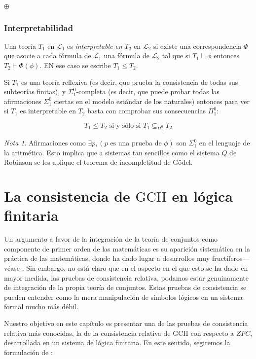 \documentclass[11pt,a4paper]{book}
\theoremstyle{plain}
\theoremstyle{definition}
\theoremstyle{remark}
\newtheorem{nota}[teorema]{Nota}
\begin{document}
$\oplus$ 



\subsection{Interpretabilidad}

Una teoría $T_1$ en $\mathcal{L}_1$ es \textit{interpretable en} $T_2$ en $\mathcal{L_2}$ si existe una correspondencia $\Phi$ que asocie a cada fórmula de $\mathcal{L}_1$ una fórmula de $\mathcal{L_2}$ tal que si $T_1 \vdash \phi$ entonces $T_2 \vdash \Phi(\phi)$. EN ese caso se escribe $T_1 \leq T_2$.

Si $ T_1 $ es una teoría reflexiva (es decir, que prueba la consistencia de todas sus subteorías finitas), y $\Sigma^0_1$-completa (es decir, que puede probar todas las afirmaciones $\Sigma^0_1$ ciertas en el modelo estándar de los naturales) entonces para ver si $T_1$ es interpretable en $T_2 $ basta con comprobar sus consecuencias $\Pi^0_1$:

$$ T_1 \leq T_2 \text{ si y sólo si }  T_1 \subseteq_{\Pi^0_1} T_2 $$



\begin{nota}
  Afirmaciones como $\exists p, (p \text{ es una prueba de } \phi)$ son $\Sigma^0_1$ en el lenguaje de la aritmética. Esto implica que a sistemas tan sencillos como el sistema $Q$ de Robinson se les aplique el teorema de incompletitud de Gödel.
\end{nota}


\chapter{La consistencia de \texorpdfstring{$\mathrm{GCH}$}{GCH} en lógica finitaria}

Un argumento a favor de la integración de la teoría de conjuntos como componente de primer orden de las matemáticas es su aparición sistemática en la práctica de las matemáticas, donde ha dado lugar a desarrollos muy fructíferos---véase \textcite{Maddy1997}. Sin embargo, no está claro que en el aspecto en el que esto se ha dado en mayor medida, las pruebas de consistencia relativa, podamos estar genuinamente de integración de la propia teoría de conjuntos. Estas pruebas de consistencia se pueden entender como la mera manipulación de símbolos lógicos en un sistema formal mucho más débil. 

Nuestro objetivo en este capítulo es presentar una de las pruebas de consistencia relativa más conocidas, la de la consistencia relativa de $\mathrm{GCH}$ con respecto a $ZFC$, desarrollada en un sistema de lógica finitaria. En este sentido, segiremos la formulación de \textcite[p. 8]{Kunen2011}:
\end{document}
